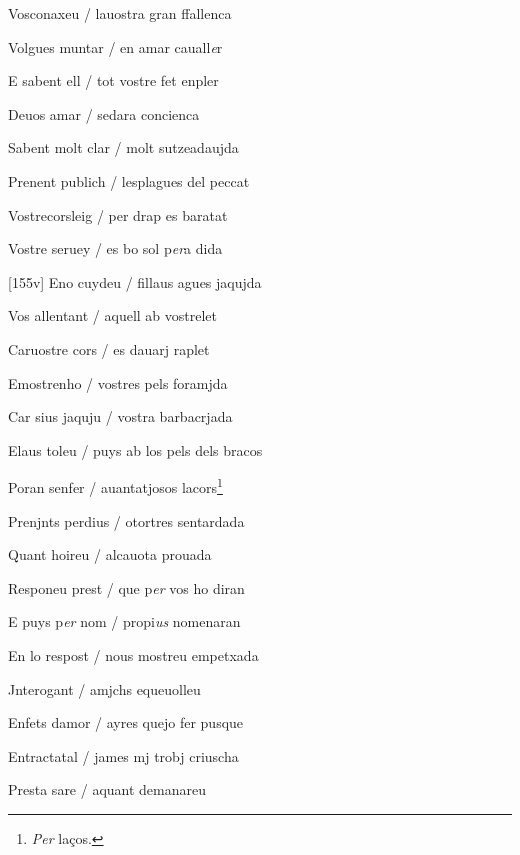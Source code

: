 \documentclass[12pt]{article}
\begin{document}
\begin{estrofa}

 Vosconaxeu / lauostra gran ffallenca

 Volgues muntar / en amar cauall\textit{e}r

 E sabent ell / tot vostre fet enpler

 Deuos amar / sedara concienca

 Sabent molt clar / molt sutzeadaujda

 Prenent publich / lesplagues del peccat

 Vostrecorsleig / per drap es baratat

 Vostre seruey / es bo sol p\textit{er}a dida

\end{estrofa}



\begin{estrofa}

 [155v] Eno cuydeu / fillaus agues jaqujda

 Vos allentant / aquell ab vostrelet

 Caruostre cors / es dauarj raplet

 Emostrenho / vostres pels foramjda

 Car sius jaquju / vostra barbacrjada

 Elaus toleu / puys ab los pels dels bracos

 Poran senfer / auantatjosos lacors\footnote{\textit{Per }la\c{c}os.}

 Prenjnts perdius / otortres sentardada

\end{estrofa}



\begin{estrofa}

 Quant hoireu / alcauota prouada

 Responeu prest / que p\textit{er} vos ho diran

 E puys p\textit{er} nom / propi\textit{us} nomenaran

 En lo respost / nous mostreu empetxada

 Jnterogant / amjchs equeuolleu

 Enfets damor / ayres quejo fer pusque

 Entractatal / james mj trobj criuscha

 Presta sare / aquant demanareu

\end{estrofa}
\end{document}
